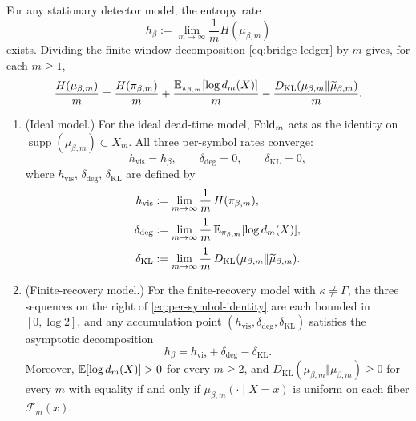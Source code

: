 \begin{theorem}\label{thm:asymptotic-ledger}
For any stationary detector model, the entropy rate
\[
h_\beta:=\lim_{m\to\infty}\frac{1}{m}H(\mu_{\beta,m})
\]
exists. Dividing the finite-window decomposition \eqref{eq:bridge-ledger} by $m$ gives, for each $m\ge 1$,
\begin{equation}\label{eq:per-symbol-identity}
\frac{H(\mu_{\beta,m})}{m}
=
\frac{H(\pi_{\beta,m})}{m}
+
\frac{\mathbb{E}_{\pi_{\beta,m}}[\log d_m(X)]}{m}
-
\frac{D_{\mathrm{KL}}(\mu_{\beta,m}\Vert\widetilde\mu_{\beta,m})}{m}.
\end{equation}
\begin{enumerate}[label=\textup{(\roman*)},leftmargin=*,itemsep=4pt]
\item \textup{(Ideal model.)} For the ideal dead-time model, $\mathrm{Fold}_m$ acts as the identity on $\operatorname{supp}(\mu_{\beta,m})\subset X_m$. All three per-symbol rates converge:
\begin{equation}\label{eq:ideal-asymptotics}
h_{\mathrm{vis}}=h_\beta,\qquad\delta_{\mathrm{deg}}=0,\qquad\delta_{\mathrm{KL}}=0,
\end{equation}
where $h_{\mathrm{vis}}$, $\delta_{\mathrm{deg}}$, $\delta_{\mathrm{KL}}$ are defined by
\begin{align}
h_{\mathrm{vis}}&:=\lim_{m\to\infty}\frac{1}{m}\,H(\pi_{\beta,m}),\label{eq:visible-rate}\\[2pt]
\delta_{\mathrm{deg}}&:=\lim_{m\to\infty}\frac{1}{m}\,\mathbb{E}_{\pi_{\beta,m}}[\log d_m(X)],\label{eq:degeneracy-rate}\\[2pt]
\delta_{\mathrm{KL}}&:=\lim_{m\to\infty}\frac{1}{m}\,D_{\mathrm{KL}}(\mu_{\beta,m}\Vert\widetilde\mu_{\beta,m}).\label{eq:kl-rate}
\end{align}
\item \textup{(Finite-recovery model.)} For the finite-recovery model with $\kappa\neq\Gamma$, the three sequences on the right of \eqref{eq:per-symbol-identity} are each bounded in $[0,\log 2]$, and any accumulation point $(h_{\mathrm{vis}},\delta_{\mathrm{deg}},\delta_{\mathrm{KL}})$ satisfies the asymptotic decomposition
\begin{equation}\label{eq:asymptotic-ledger}
h_\beta=h_{\mathrm{vis}}+\delta_{\mathrm{deg}}-\delta_{\mathrm{KL}}.
\end{equation}
Moreover, $\mathbb{E}[\log d_m(X)]>0$ for every $m\ge 2$, and $D_{\mathrm{KL}}(\mu_{\beta,m}\Vert\widetilde\mu_{\beta,m})\ge 0$ for every $m$ with equality if and only if $\mu_{\beta,m}(\cdot\mid X=x)$ is uniform on each fiber $\mathcal F_m(x)$.
\end{enumerate}
\end{theorem}

